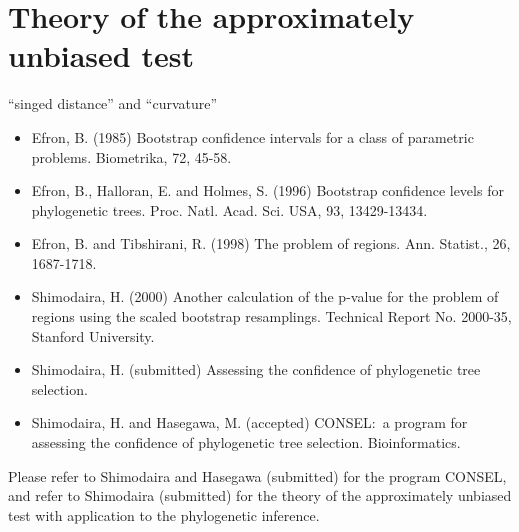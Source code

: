 \documentclass[12pt]{article}
\begin{document}
\section{Theory of the approximately unbiased test}

``singed distance'' and ``curvature''

\begin{itemize}
 \item Efron, B. (1985) Bootstrap confidence intervals for a class of
       parametric problems. Biometrika, 72, 45-58.
 \item Efron, B., Halloran, E. and Holmes, S. (1996) Bootstrap
       confidence levels for phylogenetic
       trees. Proc. Natl. Acad. Sci. USA, 93, 13429-13434.
 \item Efron, B. and Tibshirani, R. (1998) The problem of
       regions. Ann. Statist., 26, 1687-1718.
 \item Shimodaira, H. (2000) Another calculation of the p-value for the
       problem of regions using the scaled bootstrap
       resamplings. Technical Report No. 2000-35, Stanford University.
 \item Shimodaira, H. (submitted) Assessing the confidence of
       phylogenetic tree selection.
 \item Shimodaira, H. and Hasegawa, M. (accepted) CONSEL:~a program for
       assessing the confidence of phylogenetic tree selection. 
       Bioinformatics.
\end{itemize}

Please refer to Shimodaira and Hasegawa (submitted) for the program
CONSEL, and refer to Shimodaira (submitted) for the theory of the
approximately unbiased test with application to the phylogenetic
inference.
\end{document}

